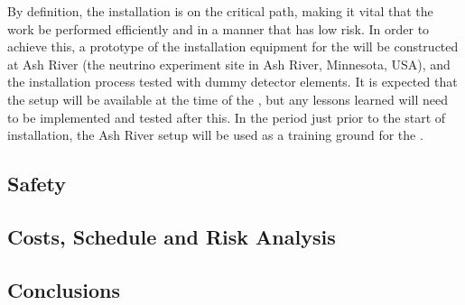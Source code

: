 By definition, the installation  is on the critical path, making it vital
that the work be performed efficiently and in a manner that has low
risk. In order to achieve this, a prototype of the installation
equipment for the   will be constructed at Ash
River (the \nova neutrino experiment  site in Ash River, Minnesota, USA), and the installation process tested with dummy detector
elements. It is expected that the setup will be available at the time
of the , but any lessons learned will need to be implemented and
tested after this. In the period just prior to the start of
installation, the Ash River setup will be used as a training ground for
the .




\subsection{Safety}
\label{sec:fdsp-tc-inst-safety}


\subsection{Costs, Schedule and Risk Analysis}
\label{sec:fdsp-tc-inst-cost}

\subsection{Conclusions}
\label{sec:fdsp-tc-inst-concl}




